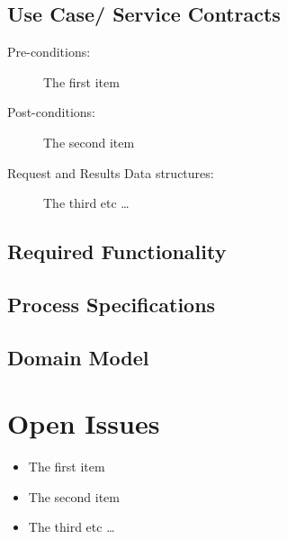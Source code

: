 \documentclass{article}
\begin{document}
		\subsection{Use Case/ Service Contracts}
			\begin{description}
			  \item[Pre-conditions:] The first item
			  \item[Post-conditions:] The second item
			  \item[Request and Results Data structures:] The third etc \ldots
			\end{description}
			
		\subsection{Required Functionality}
	
		\subsection{Process Specifications}
		
		\subsection{Domain Model}
		
	\cleardoublepage
	\section{Open Issues}
		\begin{itemize}
		  \item The first item
		  \item The second item
		  \item The third etc \ldots
		\end{itemize}
		
\end{document}
